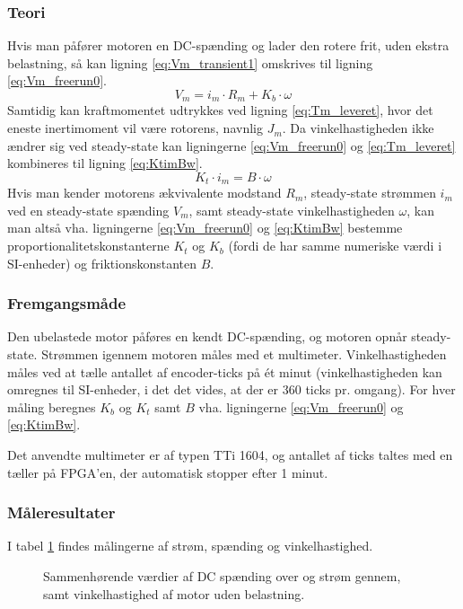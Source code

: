 \subsubsection{Teori}
Hvis man påfører motoren en DC-spænding og lader den rotere frit, uden ekstra belastning,
så kan ligning \ref{eq:Vm_transient1} omskrives til ligning \ref{eq:Vm_freerun0}.
\begin{equation}
	V_m=i_m\cdot{R_m}+K_b\cdot\omega
	\label{eq:Vm_freerun0}
 \end{equation}
Samtidig kan kraftmomentet udtrykkes ved ligning \ref{eq:Tm_leveret}, hvor det eneste inertimoment vil være
rotorens, navnlig $J_m$.
Da vinkelhastigheden ikke ændrer sig ved steady-state kan ligningerne \ref{eq:Vm_freerun0} og \ref{eq:Tm_leveret} kombineres
til ligning \ref{eq:KtimBw}.
\begin{equation}
	K_t\cdot{i_m}=B\cdot\omega
	\label{eq:KtimBw}
 \end{equation}
Hvis man kender motorens ækvivalente modstand $R_m$, steady-state strømmen $i_m$ ved en steady-state spænding $V_m$,
samt steady-state vinkelhastigheden $\omega$, kan man altså vha. ligningerne \ref{eq:Vm_freerun0} og \ref{eq:KtimBw} bestemme
proportionalitetskonstanterne $K_t$ og $K_b$ (fordi de har samme numeriske værdi i SI-enheder) og friktionskonstanten $B$.
\subsubsection{Fremgangsmåde}
Den ubelastede motor påføres en kendt DC-spænding, og motoren opnår steady-state.
Strømmen igennem motoren måles med et multimeter.
Vinkelhastigheden måles ved at tælle antallet af encoder-ticks på ét minut
(vinkelhastigheden kan omregnes til SI-enheder, i det det vides, at der er 360 ticks pr. omgang).
For hver måling beregnes $K_b$ og $K_t$ samt $B$ vha. ligningerne \ref{eq:Vm_freerun0} og \ref{eq:KtimBw}.

Det anvendte multimeter er af typen TTi 1604,
og antallet af ticks taltes med en tæller på FPGA'en, der automatisk stopper efter 1 minut.
\subsubsection{Måleresultater}
I tabel \ref{tb:steadystatenoload} findes målingerne af strøm, spænding og vinkelhastighed.
\begin{figure}[th!]
	\centering
	
	\captionsetup{type=table}
	\caption[Steady-state spænding, strøm og vinkelhastighed uden belastning]
			{Sammenhørende værdier af DC spænding over og strøm gennem, samt vinkelhastighed af motor uden belastning.}
	\label{tb:steadystatenoload}
\end{figure}
